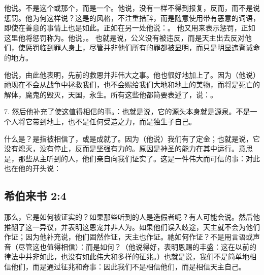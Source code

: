 他说。不是这个或那个，而是一个。他说，没有一样不得到报复，反而，而不是说惩罚。他为何这样说？这是的风格，不注重措辞，而是随意使用带有恶意的词语，即使在善意的事情上也是如此。正如在另一处他说：。 他又用来表示惩罚，正如这里他将惩罚称为。他说，。 也就是说，公义没有被违反，而是天主出去反对他们，使惩罚临到罪人身上，尽管并非他们所有的罪都被显明，而只是明显违背诫命的地方。\par

他说，由此他表明，先前的救恩并非伟大之事。他也很好地加上了。因为（他说）祂现在不会从战争中拯救我们，也不会赐给我们大地和地上的美物，而将是死亡的解体，魔鬼的毁灭，天国，永生。所有这些他都简要表述了，说：。\par

7. 然后他补充了使这值得相信的事。：也就是说，它的源头本身就是源泉。不是一个人将它带到地上，也不是任何受造之力，而是独生子自己。\par

什么是？是指被相信了，或是成就了。因为（他说）我们有了定金；也就是说，它没有熄灭，没有停止，反而是坚强有力的。原因是神圣的能力在其中运行。意思是，那些从主听到的人，他们亲自向我们证实了。这是一件伟大而可信的事：对此也在他的开头说：\par


\subsection{希伯来书 2:4}

那么，它是如何被证实的？如果那些听到的人是造假者呢？有人可能会说。然后他推翻了这一异议，并表明这恩宠并非人为。如果他们误入歧途，天主就不会为他们作证；因为他补充说，他们固然作证，天主也作证。祂如何作证？不是用言语或声音（尽管这也值得相信）：而是如何？（他说得好，表明恩赐的丰盛：这在以前的律法中并非如此，也没有如此伟大和多样的征兆。）也就是说，我们不是简单地相信他们，而是通过征兆和奇事：因此我们不是相信他们，而是相信天主自己。\par

